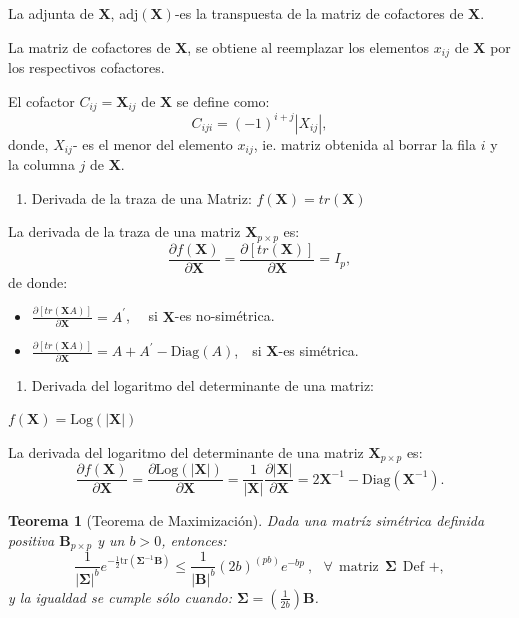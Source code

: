\documentclass[
]{book}
\providecommand{\tightlist}{%
  \setlength{\itemsep}{0pt}\setlength{\parskip}{0pt}}
\newtheorem{theorem}{Teorema}[chapter]
\theoremstyle{definition}
\theoremstyle{definition}
\theoremstyle{definition}
\theoremstyle{definition}
\theoremstyle{remark}
\begin{document}
La adjunta de \(\mathbf{X}\), adj\((\mathbf{X})\)-es la transpuesta de la matriz de cofactores de \(\mathbf{X}\).

La matriz de cofactores de \(\mathbf{X}\), se obtiene al reemplazar los elementos \(x_{ij}\) de \(\mathbf{X}\) por los respectivos cofactores.

El cofactor \(C_{ij}=\mathbf{X}_{ij}\) de \(\mathbf{X}\) se define como:
\[
C_{iji}=(-1)^{i+j}|X_{ij}|,
\]
donde, \(X_{ij}\)- es el menor del elemento \(x_{ij}\), ie. matriz obtenida al borrar la fila \(i\) y la columna \(j\) de \(\mathbf{X}\).

\begin{enumerate}
\def\labelenumi{\arabic{enumi}.}
\setcounter{enumi}{5}
\tightlist
\item
  Derivada de la traza de una Matriz: \(f(\mathbf{X})=tr(\mathbf{X})\)
\end{enumerate}

La derivada de la traza de una matriz \(\mathbf{X}_{p\times p}\) es:
\[
\frac{\partial f(\mathbf{X})}{\partial \mathbf{X}}=\frac{\partial [tr(\mathbf{X})] }{\partial \mathbf{X}}=I_p,
\]
de donde:

\begin{itemize}
\item
  \(\frac{\partial [tr(\mathbf{X}A)] }{\partial \mathbf{X}}=A^{'}\),~~ si \(\mathbf{X}\)-es no-simétrica.
\item
  \(\frac{\partial [tr(\mathbf{X}A)] }{\partial \mathbf{X}}=A+A^{'}-\text{Diag}(A)\),~~si \(\mathbf{X}\)-es simétrica.
\end{itemize}

\begin{enumerate}
\def\labelenumi{\arabic{enumi}.}
\setcounter{enumi}{6}
\tightlist
\item
  Derivada del logaritmo del determinante de una matriz:
\end{enumerate}

\(f(\mathbf{X})=\text{Log}(|\mathbf{X}|)\)

La derivada del logaritmo del determinante de una matriz \(\mathbf{X}_{p\times p}\) es:
\[
\frac{\partial f(\mathbf{X})}{\partial \mathbf{X}}=\frac{\partial \text{Log}(|\mathbf{X}|)}{\partial \mathbf{X}}=\frac{1}{|\mathbf{X}|}\frac{\partial |\mathbf{X}|}{\partial \mathbf{X}}=2\mathbf{X}^{-1}-\text{Diag}(\mathbf{X}^{-1}).
\]

\begin{theorem}[Teorema de Maximización]
\protect\hypertarget{thm:teorema-maximo}{}\label{thm:teorema-maximo}Dada una matríz simétrica definida positiva \(\mathbf{B}_{p\times p}\) y un \(b>0\), entonces:
\[
\frac{1}{|\mathbf{\mathbf{\Sigma}}|^{b}}
  e^{-\frac{1}{2} \text{tr}\left(   \mathbf{\mathbf{\Sigma}}^{-1} \mathbf{B} \right)} \leq
\frac{1}{|\mathbf{B}|^{b}} (2b)^{(pb)}
  e^{-bp} \ , \ \ \ \forall \ \ \text{matriz} \ \ \mathbf{\mathbf{\Sigma}} \ \ \text{Def +},
\]
y la igualdad se cumple sólo cuando:
\(\mathbf{\mathbf{\Sigma}}=\left(\frac{1}{2b} \right)\mathbf{B}\).
\end{theorem}
\end{document}
